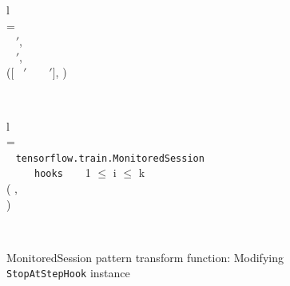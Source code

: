 \begin{figure}[ht!]
 \noindent
  \begin{tabular}{l}
     \\
    \tstmt{\kwith ~ \mul{\nwithitem} ~ \kcolon ~ \mul{\nstmt}}{\smodenv} = \\
    \inden \ktlet ~ \mul{\nwithitem}$'$,  \kteq ~ \twwithitem{\mul{\nwithitem}}{\smodenv} \ktin \\
    \inden \ktlet ~ \mul{\nstmt}$'$,  \kteq ~  \ktin \\

    \inden ([\kwith ~ \mul{\nwithitem}$'$ ~ \kcolon ~ \mul{\nstmt}$'$], )
  \end{tabular}\\

  \begin{tabular}{l}
    \typdesc{\fkwithitem & : & \dwithitem ~ $\rightarrow$ ~ \dmodenv ~ $\rightarrow$ ~ (\dwithitem ~ $\times$ \dmodenv)}  \\
     = \\

    \inden \ktif ~  \ktsubtysubs{\smodenv} {\tt tensorflow.train.MonitoredSession} ~ \ktthen \\
    \inden\inden \ktif ~  ~ \kteq ~ {\tt hooks} ~ \ktwhen ~ 1 $\leq$ i $\leq$ k ~ \ktthen\\
    \inden\inden\inden( , \\
    \inden\inden\inden\inden {}) \\
  \end{tabular}\\\vpar
\caption{MonitoredSession pattern transform function: Modifying {\tt StopAtStepHook} instance}
  \label{fig:trans:monsessrule}
\end{figure}

